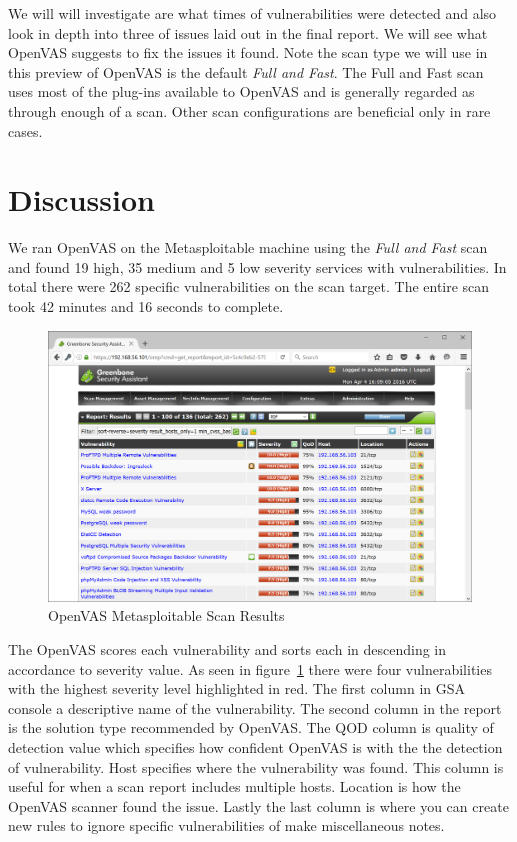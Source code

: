 \documentclass[12pt]{article}
\begin{document}
We will will investigate are what times of vulnerabilities were detected and
also look in depth into three of issues laid out in the final report. We will
see what OpenVAS suggests to fix the issues it found. Note the scan type we 
will use in this preview of OpenVAS is the default \textit{Full and Fast}.
The Full and Fast scan uses most of the plug-ins available to OpenVAS and is
generally regarded as through enough of a scan. Other scan configurations
are beneficial only in rare cases. 

\section{Discussion}
\label{sect:discussion}
We ran OpenVAS on the Metasploitable machine using the \textit{Full and Fast}
scan and found 19 high, 35 medium and 5 low severity services with 
vulnerabilities. In total there were 262 specific vulnerabilities on the 
scan target. The entire scan took 42 minutes and 16 seconds to complete. 

\begin{figure}[H]
    \centering
    \includegraphics[width=5.5in]{images/20160403-metasploitable-scan.PNG}
    \caption{OpenVAS Metasploitable Scan Results}
    \label{fig:overview_scan}
\end{figure}

The OpenVAS scores each vulnerability and sorts each  in descending in 
accordance to severity value. As seen in figure~\ref{fig:overview_scan} there 
were four vulnerabilities with the highest severity level highlighted in red. 
The first column in GSA console a descriptive name of the vulnerability. The 
second column in the report is the solution type recommended by OpenVAS. 
The QOD column is quality of detection value which specifies how confident 
OpenVAS is with the the detection of vulnerability. Host specifies where 
the vulnerability was found. This column is useful for when a scan report 
includes multiple hosts. Location is how the OpenVAS scanner found the 
issue. Lastly the last column is where you can create new rules to ignore 
specific vulnerabilities of make miscellaneous notes. 
\end{document}
